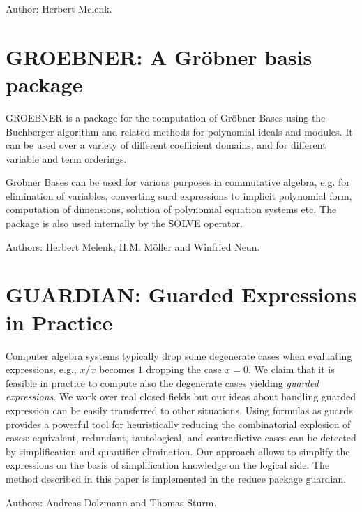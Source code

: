 Author: Herbert Melenk.



\newpage

\section{GROEBNER: A Gr\"{o}bner basis package} 
\label{GROEBNER}

GROEBNER is a package for the computation of Gr\"obner
Bases using the Buchberger algorithm and related methods
for polynomial ideals and modules.  It can be used over a variety of
different coefficient domains, and for different variable and term
orderings.

Gr\"obner Bases can be used for various purposes in commutative
algebra, e.g. for elimination of variables,
converting surd expressions to implicit polynomial form,
computation of dimensions, solution of polynomial equation systems 
 etc. 
The package is also used internally by the \f{SOLVE}
operator.

Authors: Herbert Melenk, H.M. M\"oller and Winfried Neun.



\newpage

\section{GUARDIAN: Guarded Expressions in Practice}
\label{GUARDIAN}

Computer algebra systems typically drop some degenerate cases when
evaluating expressions, e.g., $x/x$ becomes $1$ dropping the case
$x=0$. We claim that it is feasible in practice to compute also the
degenerate cases yielding {\em guarded expressions}. We work over real
closed fields but our ideas about handling guarded expression can be
easily transferred to other situations. Using formulas as guards
provides a powerful tool for heuristically reducing the combinatorial
explosion of cases: equivalent, redundant, tautological, and
contradictive cases can be detected by simplification and quantifier
elimination. Our approach allows to simplify the expressions on the
basis of simplification knowledge on the logical side. The method
described in this paper is implemented in the {\sc reduce} package
{\sc guardian}.

Authors: Andreas Dolzmann and Thomas Sturm.

